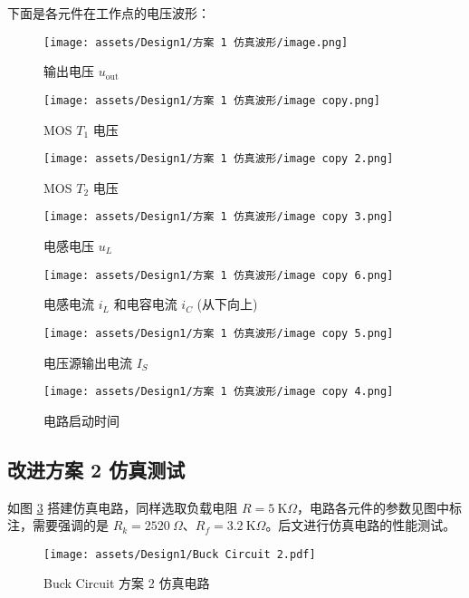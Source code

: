 \documentclass[UTF8]{article}
\def\kO{\ \mathrm{K}\Omega}
\def\KO{\ \mathrm{K}\Omega}
\def\kO{\ \mathrm{K}\Omega}
\def\KO{\ \mathrm{K}\Omega}
\theoremstyle{MyLineTheoremStyle} %
\theoremstyle{MyBlockTheoremStyle} %
\theoremstyle{MySubsubsectionStyle} %
\begin{document}
下面是各元件在工作点的电压波形：
\begin{figure}[H]\centering
    \texttt{[image: assets/Design1/方案 1 仿真波形/image.png]}
    \vspace*{-7mm}
    \caption{输出电压 $u_{\text{out}}$}
    \label{输出电压 1}
\end{figure}
\begin{figure}[H]\centering
    \texttt{[image: assets/Design1/方案 1 仿真波形/image copy.png]}
    \vspace*{-7mm}
    \caption{MOS $T_1$ 电压}
\end{figure}
\begin{figure}[H]\centering
    \texttt{[image: assets/Design1/方案 1 仿真波形/image copy 2.png]}
    \vspace*{-7mm}
    \caption{MOS $T_2$ 电压}
\end{figure}
\begin{figure}[H]\centering
    \texttt{[image: assets/Design1/方案 1 仿真波形/image copy 3.png]}
    \caption{电感电压 $u_L$}
\end{figure}
\begin{figure}[H]\centering
    \texttt{[image: assets/Design1/方案 1 仿真波形/image copy 6.png]}
    \caption{电感电流 $i_L$ 和电容电流 $i_C$ (从下向上)}
\end{figure}
\begin{figure}[H]\centering
    \texttt{[image: assets/Design1/方案 1 仿真波形/image copy 5.png]}
    \caption{电压源输出电流 $I_S$}
\end{figure}
\begin{figure}[H]\centering
    \texttt{[image: assets/Design1/方案 1 仿真波形/image copy 4.png]}
    \caption{电路启动时间}
    \label{启动时间 1}
\end{figure}

\subsection{改进方案 2 仿真测试}

如图 \ref{Buck Circuit 方案 2} 搭建仿真电路，同样选取负载电阻 $R = 5 \kO$，电路各元件的参数见图中标注，需要强调的是 $R_k = 2520\ \Omega$、$R_f =  3.2 \KO$。后文进行仿真电路的性能测试。

\begin{figure}[H]\centering
    \texttt{[image: assets/Design1/Buck Circuit 2.pdf]}
    \caption{Buck Circuit 方案 2 仿真电路}
    \label{Buck Circuit 方案 2}
\end{figure}
\end{document}
